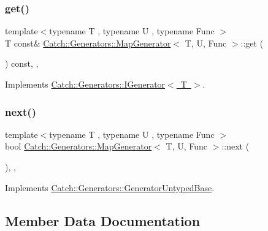 \subsubsection{\texorpdfstring{get()}{get()}}
{\footnotesize\ttfamily template$<$typename T , typename U , typename Func $>$ \\
T const\& \mbox{\hyperlink{class_catch_1_1_generators_1_1_map_generator}{Catch\+::\+Generators\+::\+Map\+Generator}}$<$ T, U, Func $>$\+::get (\begin{DoxyParamCaption}{ }\end{DoxyParamCaption}) const\hspace{0.3cm}{\ttfamily [inline]}, {\ttfamily [override]}, {\ttfamily [virtual]}}



Implements \mbox{\hyperlink{struct_catch_1_1_generators_1_1_i_generator_a525d381fc9249a885b075a0632a8579a}{Catch\+::\+Generators\+::\+I\+Generator$<$ T $>$}}.

\mbox{\label{class_catch_1_1_generators_1_1_map_generator_aa07e2f12d38ae060c30cc30d9dc236c5}} 
\subsubsection{\texorpdfstring{next()}{next()}}
{\footnotesize\ttfamily template$<$typename T , typename U , typename Func $>$ \\
bool \mbox{\hyperlink{class_catch_1_1_generators_1_1_map_generator}{Catch\+::\+Generators\+::\+Map\+Generator}}$<$ T, U, Func $>$\+::next (\begin{DoxyParamCaption}{ }\end{DoxyParamCaption})\hspace{0.3cm}{\ttfamily [inline]}, {\ttfamily [override]}, {\ttfamily [virtual]}}



Implements \mbox{\hyperlink{class_catch_1_1_generators_1_1_generator_untyped_base_aeed3c0cd6233c5f553549e453b8d6638}{Catch\+::\+Generators\+::\+Generator\+Untyped\+Base}}.



\subsection{Member Data Documentation}
\mbox{\label{class_catch_1_1_generators_1_1_map_generator_a970d45e8dccf903d3539daada255da42}} 
